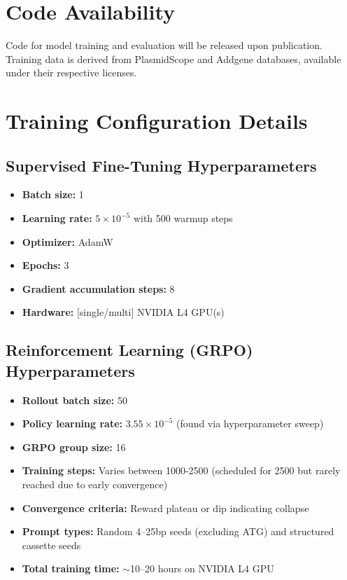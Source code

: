 \documentclass{article}
\theoremstyle{plain}
\theoremstyle{definition}
\theoremstyle{remark}
\begin{document}
\section*{Code Availability}

Code for model training and evaluation will be released upon publication.
Training data is derived from PlasmidScope and Addgene databases,
available under their respective licenses.


\newpage

\appendix

\section{Training Configuration Details}

\subsection{Supervised Fine-Tuning Hyperparameters}

\begin{itemize}
\item \textbf{Batch size:} 1
\item \textbf{Learning rate:} $5 \times 10^{-5}$ with 500 warmup steps
\item \textbf{Optimizer:} AdamW
\item \textbf{Epochs:} 3
\item \textbf{Gradient accumulation steps:} 8
\item \textbf{Hardware:} [single/multi] NVIDIA L4 GPU(s)
\end{itemize}

\subsection{Reinforcement Learning (GRPO) Hyperparameters}

\begin{itemize}
\item \textbf{Rollout batch size:} 50
\item \textbf{Policy learning rate:} $3.55 \times 10^{-5}$ (found via
hyperparameter sweep)
\item \textbf{GRPO group size:} 16
\item \textbf{Training steps:} Varies between 1000-2500 (scheduled for
2500 but rarely reached due to early convergence)
\item \textbf{Convergence criteria:} Reward plateau or dip indicating
collapse
\item \textbf{Prompt types:} Random 4--25bp seeds (excluding ATG) and
structured cassette seeds
\item \textbf{Total training time:} $\sim$10--20 hours on NVIDIA L4 GPU
\end{itemize}
\end{document}

